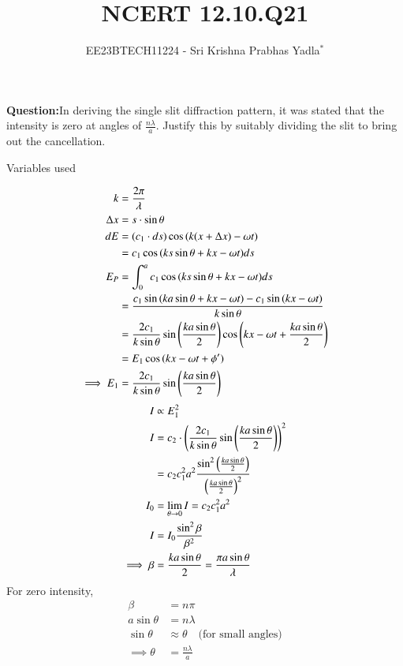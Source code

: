 \documentclass[journal,12pt,twocolumn]{IEEEtran}
\theoremstyle{remark}
\begin{document}

\vspace{3cm}

\title{NCERT 12.10.Q21}
\author{EE23BTECH11224 - Sri Krishna Prabhas Yadla$^{*}$%
}
\maketitle
\newpage
\bigskip

\renewcommand{\thefigure}{\arabic{figure}}
\renewcommand{\thetable}{\arabic{table}}


\vspace{3cm}
\textbf{Question:}In deriving the single slit diffraction pattern, it was stated that the intensity is zero at angles of $\frac{n\lambda}{a}$. Justify this by suitably dividing the slit to bring out the cancellation.
\\
\solution
\begin{table}[htbp]
\centering
\def\arraystrech{1.5}

\caption{Variables used}
\label{tab:1.12_10_Q21}
\end{table}
\begin{align}
    k &= \frac{2\pi}{\lambda} \\
\Delta x &= s\cdot \sin{\theta}\\
    dE &= (c_1\cdot ds)\cos{(k(x+\Delta x)-\omega t)} \\
    &= c_1 \cos{(ks\sin{\theta} + kx-\omega t)} ds \\
    E_P &= \int_{0}^{a} c_1\cos{(ks\sin{\theta} + kx-\omega t)} ds \\
    &= \frac{c_1 \sin{(ka\sin{\theta} + kx-\omega t)}-c_1\sin{(kx-\omega t)}}{k\sin{\theta}} \\
    &= \frac{2c_1}{k\sin{\theta}}\sin{ \ensuremath{\left(\frac{ka\sin{\theta}}{2}\right)}}\cos{\ensuremath{\left(kx-\omega t+ \frac{ka\sin{\theta}}{2}\right)}} \\
    &= E_1 \cos{(kx-\omega t+ \phi')} \\
    \implies E_1 &= \frac{2c_1}{k\sin{\theta}}\sin{ \ensuremath{\left(\frac{ka\sin{\theta}}{2}\right)}}
\end{align}
\begin{align}
    I &\propto E_1^2  \\
    I &= c_2 \cdot \left(\frac{2c_1}{k\sin{\theta}}\sin{ \ensuremath{\left( \frac{ka\sin{\theta}}{2}\right)}}\right)^2 \\
    &= c_2c_1^2a^2 \frac{\sin^2{\left(\frac{ka\sin{\theta}}{2}\right)}}{\left(\frac{ka\sin{\theta}}{2}\right)^2}\\
    I_0 &= \lim_{\theta\to 0} I = c_2c_1^2a^2   \\
    I &= I_0 \frac{\sin^2{\beta}}{\beta^2}  \\
\implies    \beta &= \frac{ka\sin{\theta}}{2} = \frac{\pi a\sin{\theta}}{\lambda}
\end{align}
For zero intensity,
\begin{align}
    \beta &= n\pi \\
    a\sin{\theta} &= n\lambda \\
    \sin{\theta} &\approx \theta \quad \text{(for small angles)} \\
    \implies \theta &= \frac{n\lambda}{a}
\end{align}
\end{document}

